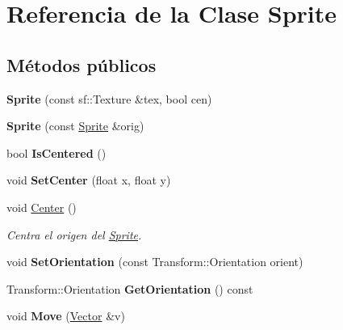 \hypertarget{classSprite}{\section{Referencia de la Clase Sprite}
\label{classSprite}
}
\subsection*{Métodos públicos}
\begin{DoxyCompactItemize}
\item 
\hypertarget{classSprite_a12db2aa93e0945b2c4e7524797dea595}{{\bfseries Sprite} (const sf\-::\-Texture \&tex, bool cen)}\label{classSprite_a12db2aa93e0945b2c4e7524797dea595}

\item 
\hypertarget{classSprite_a6865b4a603a11323d241d311b6be4883}{{\bfseries Sprite} (const \hyperlink{classSprite}{Sprite} \&orig)}\label{classSprite_a6865b4a603a11323d241d311b6be4883}

\item 
\hypertarget{classSprite_a6ae847a4b9dd3c0e4ae5ecbadf4435bb}{bool {\bfseries Is\-Centered} ()}\label{classSprite_a6ae847a4b9dd3c0e4ae5ecbadf4435bb}

\item 
\hypertarget{classSprite_a7ac80cebb5d5f28ab2368dab973c1024}{void {\bfseries Set\-Center} (float x, float y)}\label{classSprite_a7ac80cebb5d5f28ab2368dab973c1024}

\item 
\hypertarget{classSprite_a7e171c2e0fe70f3e4d6292c5751c9e9c}{void \hyperlink{classSprite_a7e171c2e0fe70f3e4d6292c5751c9e9c}{Center} ()}\label{classSprite_a7e171c2e0fe70f3e4d6292c5751c9e9c}

\begin{DoxyCompactList}\small\item\em Centra el origen del \hyperlink{classSprite}{Sprite}. \end{DoxyCompactList}\item 
\hypertarget{classSprite_acd478ec9eae5f31f1a529ff544aeed21}{void {\bfseries Set\-Orientation} (const Transform\-::\-Orientation orient)}\label{classSprite_acd478ec9eae5f31f1a529ff544aeed21}

\item 
\hypertarget{classSprite_a4a7f7ad5b5ab29c7da849e035ae272ca}{Transform\-::\-Orientation {\bfseries Get\-Orientation} () const }\label{classSprite_a4a7f7ad5b5ab29c7da849e035ae272ca}

\item 
\hypertarget{classSprite_ae08c9b370e8311894dd90ab8e83448b3}{void {\bfseries Move} (\hyperlink{classVector}{Vector} \&v)}\label{classSprite_ae08c9b370e8311894dd90ab8e83448b3}


\end{DoxyCompactItemize}
